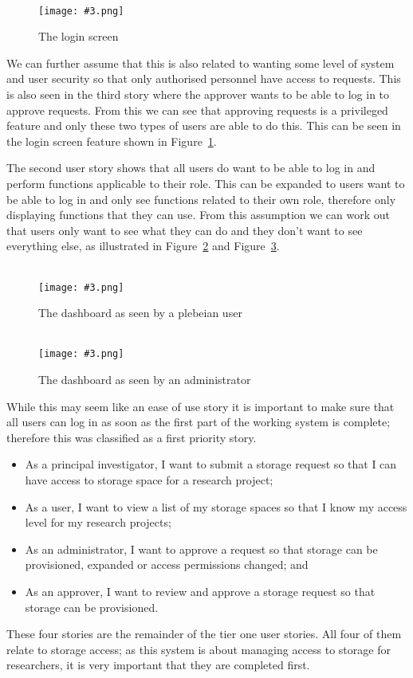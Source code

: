 \documentclass[a4paper,titlepage,12pt]{article}
\newcommand\figimg[4][\textwidth]{
	\begin{figure}
		\caption{#4}
		\label{fig:#2}
		\quad\\\texttt{[image: \#3.png]}
	\end{figure}
}
\begin{document}
\figimg{login}{login}{The login screen}

We can further assume that this is also related to wanting some level of system
and user security so that only authorised personnel have access to requests.
This is also seen in the third story where the approver wants to be able to log
in to approve requests. From this we can see that approving requests is a
privileged feature and only these two types of users are able to do this. This
can be seen in the login screen feature shown in Figure~\ref{fig:login}.

The second user story shows that all users do want to be able to log in and
perform functions applicable to their role. This can be expanded to users want
to be able to log in and only see functions related to their own role,
therefore only displaying functions that they can use. From this assumption we
can work out that users only want to see what they can do and they don't want
to see everything else, as illustrated in Figure~\ref{fig:user0} and
Figure~\ref{fig:user2}.

\figimg{user0}{user0}{The dashboard as seen by a plebeian user}

\figimg{user2}{user2}{The dashboard as seen by an administrator}

While this may seem like an ease of use story it is important to make sure that
all users can log in as soon as the first part of the working system is
complete; therefore this was classified as a first priority story.

\begin{itemize}
	\item As a principal investigator, I want to submit a storage request
	      so that I can have access to storage space for a research
	      project;
	\item As a user, I want to view a list of my storage spaces so that I
	      know my access level for my research projects;
	\item As an administrator, I want to approve a request so that storage
	      can be provisioned, expanded or access permissions changed; and
	\item As an approver, I want to review and approve a storage request so
	      that storage can be provisioned.
\end{itemize}

These four stories are the remainder of the tier one user stories. All four of
them relate to storage access; as this system is about managing access to
storage for researchers, it is very important that they are completed first.
\end{document}
